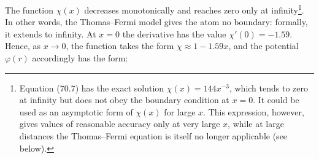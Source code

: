 The function $\chi(x)$ decreases monotonically and reaches zero only at infinity\footnote{Equation (70.7) has the exact solution $\chi(x)=144x^{-3}$, which tends to zero at infinity but does not obey the boundary condition at $x=0$. It could be used as an asymptotic form of $\chi(x)$ for large $x$. This expression, however, gives values of reasonable accuracy only at very large $x$, while at large distances the Thomas--Fermi equation is itself no longer applicable (see below).}. In other words, the Thomas--Fermi model gives the atom no boundary: formally, it extends to infinity. At $x=0$ the derivative has the value $\chi'(0)=-1.59$. Hence, as $x\to0$, the function takes the form $\chi\approx1-1.59x$, and the potential $\varphi(r)$ accordingly has the form:
